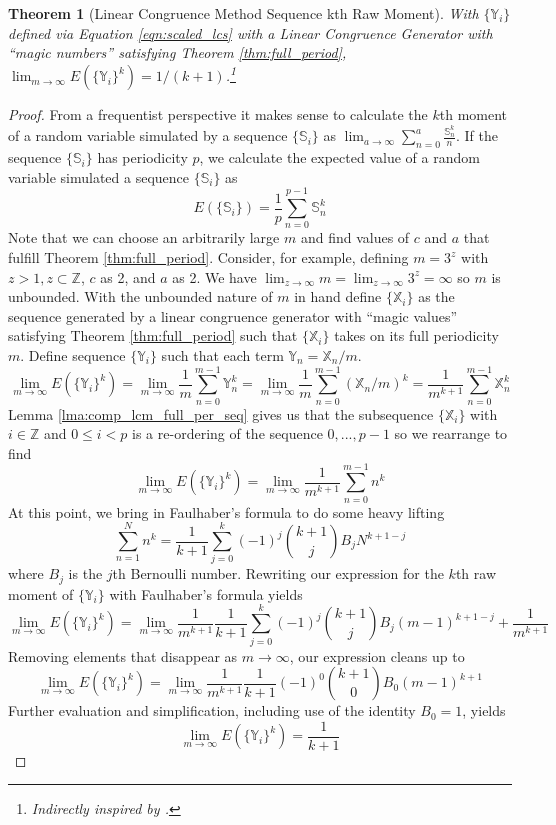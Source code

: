 \documentclass{article}
\theoremstyle{break}
\newtheorem{theorem}{Theorem}[section]
\begin{document}
\begin{theorem}[Linear Congruence Method Sequence kth Raw Moment] \label{thm:lcm_kth_mom}
With $\{\mathbb{Y}_{i}\}$ defined via Equation \ref{eqn:scaled_lcs} with a Linear Congruence Generator with ``magic numbers'' satisfying Theorem \ref{thm:full_period}, $\lim_{m\rightarrow\infty}E(\{\mathbb{Y}_{i}\}^k) = 1/(k+1)$.\footnote{Indirectly inspired by \autocite{schruben_ieor_2007}.}
\end{theorem}
\begin{proof}

From a frequentist perspective it makes sense to calculate the $k$th moment of a  random variable simulated by a sequence $\{\mathbb{S}_i\}$ as $\lim_{a\rightarrow \infty} \sum_{n = 0}^{a}\frac{\mathbb{S}_{n}^k}{n}.$ If the sequence $\{\mathbb{S}_i\}$ has periodicity $p$, we calculate the expected value of a random variable simulated a sequence $\{\mathbb{S}_i\}$ as 
\[
E(\{\mathbb{S}_i\}) = \frac{1}{p} \sum_{n = 0}^{p-1} \mathbb{S}_n^k
\]
Note that we can choose an arbitrarily large $m$ and find values of $c$ and $a$ that fulfill Theorem \ref{thm:full_period}. Consider, for example, defining $m = 3^z$ with $z > 1, z \subset \mathbb{Z}$, $c$ as 2, and $a$ as 2. We have $\lim_{z \rightarrow \infty} m = \lim_{z \rightarrow \infty} 3^z = \infty$ so $m$ is unbounded.
With the unbounded nature of $m$ in hand define $\{\mathbb{X}_{i}\}$ as the sequence generated by a linear congruence generator with ``magic values'' satisfying Theorem \ref{thm:full_period} such that $\{\mathbb{X}_{i}\}$ takes on its full periodicity $m$. Define sequence $\{\mathbb{Y}_i\}$ such that each term $\mathbb{Y}_n = \mathbb{X}_n/m$.
\[
\lim_{m \rightarrow \infty} E(\{\mathbb{Y}_i\}^k) = \lim_{m \rightarrow \infty} \frac{1}{m} \sum_{n = 0}^{m-1} \mathbb{Y}_n^k = \lim_{m \rightarrow \infty} \frac{1}{m} \sum_{n = 0}^{m-1} (\mathbb{X}_n/m)^k = \frac{1}{m^{k+1}} \sum_{n = 0}^{m-1} \mathbb{X}_n^k
\]
Lemma \ref{lma:comp_lcm_full_per_seq} gives us that the subsequence $\{\mathbb{X}_i\}$ with $i \in \mathbb{Z}$ and $0 \leq i < p$ is a re-ordering of the sequence $0, ..., p - 1$ so we rearrange to find
\[
\lim_{m \rightarrow \infty} E(\{\mathbb{Y}_i\}^k) = \lim_{m \rightarrow \infty} \frac{1}{m^{k+1}} \sum_{n = 0}^{m-1} n^k
\]
At this point, we bring in Faulhaber's formula to do some heavy lifting
\[
\sum_{n=1}^{N} n^{k} = \frac{1}{k+1} \sum_{j=0}^{k} (-1)^j {k+1 \choose j} B_j N^{k+1-j}
\]
where $B_j$ is the $j$th Bernoulli number. Rewriting our expression for the $k$th raw moment of $\{\mathbb{Y}_i\}$ with Faulhaber's formula yields
\[
\lim_{m \rightarrow \infty} E(\{\mathbb{Y}_i\}^k) = \lim_{m \rightarrow \infty} \frac{1}{m^{k+1}} \frac{1}{k+1} \sum_{j=0}^{k} (-1)^j {k+1 \choose j} B_j (m-1)^{k+1-j} + \frac{1}{m^{k+1}}
\]
Removing elements that disappear as $m \rightarrow \infty$, our expression cleans up to
\[
\lim_{m \rightarrow \infty} E(\{\mathbb{Y}_i\}^k) = \lim_{m \rightarrow \infty} \frac{1}{m^{k+1}} \frac{1}{k+1} (-1)^0 {k+1 \choose 0} B_0 (m-1)^{k+1} 
\]
Further evaluation and simplification, including use of the identity $B_0 = 1$, yields
\[
\lim_{m \rightarrow \infty} E(\{\mathbb{Y}_i\}^k) = \frac{1}{k+1}
\]
\end{proof}
\end{document}
